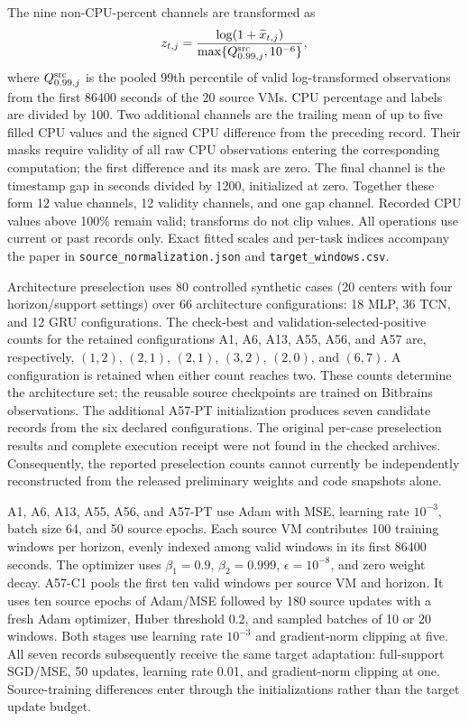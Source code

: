 \documentclass[10pt,a4paper]{article}
\makeatletter
\renewcommand\section{\@startsection{section}{1}{0pt}{-2ex plus -.5ex minus -.2ex}{.8ex plus .2ex}{\normalfont\large\bfseries}}
\makeatother
\begin{document}
The nine non-CPU-percent channels are transformed as
\begin{equation}
z_{t,j}=\frac{\log(1+\widetilde x_{t,j})}
{\max\{Q^{\rm src}_{0.99,j},10^{-6}\}},
\end{equation}
where $Q^{\rm src}_{0.99,j}$ is the pooled 99th percentile of valid
log-transformed observations from the first 86400 seconds of the 20 source
VMs. CPU percentage and labels are divided by 100. Two additional channels
are the trailing mean of up to five filled CPU values and the signed CPU
difference from the preceding record. Their masks require validity of all
raw CPU observations entering the corresponding computation; the first
difference and its mask are zero. The final channel is the timestamp gap in
seconds divided by 1200, initialized at zero. Together these form 12 value
channels, 12 validity channels, and one gap channel. Recorded CPU values above
100\% remain valid; transforms do not clip values. All operations use current
or past records only. Exact fitted scales and per-task indices accompany the
paper in \texttt{source\_normalization.json} and \texttt{target\_windows.csv}.

\section{Candidate Bank and Source Training}
Architecture preselection uses 80 controlled synthetic cases (20 centers
with four horizon/support settings) over 66 architecture configurations:
18 MLP, 36 TCN, and 12 GRU configurations.
The check-best and validation-selected-positive counts for the retained
configurations A1, A6, A13, A55, A56, and A57 are, respectively,
$(1,2)$, $(2,1)$, $(2,1)$, $(3,2)$, $(2,0)$, and $(6,7)$.
A configuration is retained when either count reaches two. These counts
determine the architecture set; the reusable source checkpoints are trained
on Bitbrains observations. The additional A57-PT initialization produces
seven candidate records from the six declared configurations.
The original per-case preselection results and complete execution receipt were
not found in the checked archives. Consequently, the reported preselection
counts cannot currently be independently reconstructed from the released
preliminary weights and code snapshots alone.



A1, A6, A13, A55, A56, and A57-PT use Adam with MSE, learning rate
$10^{-3}$, batch size 64, and 50 source epochs. Each source VM contributes
100 training windows per horizon, evenly indexed among valid windows in its
first 86400 seconds. The optimizer uses
$\beta_1=0.9$, $\beta_2=0.999$, $\epsilon=10^{-8}$, and zero weight decay.
A57-C1 pools the first ten valid windows per source VM and horizon. It uses
ten source epochs of Adam/MSE followed by 180 source updates
with a fresh Adam optimizer, Huber threshold 0.2, and sampled batches
of 10 or 20 windows. Both stages use learning rate $10^{-3}$ and
gradient-norm clipping at five. All seven records subsequently receive the
same target adaptation: full-support SGD/MSE, 50 updates, learning rate
0.01, and gradient-norm clipping at one. Source-training differences enter
through the initializations rather than the target update budget.
\end{document}
